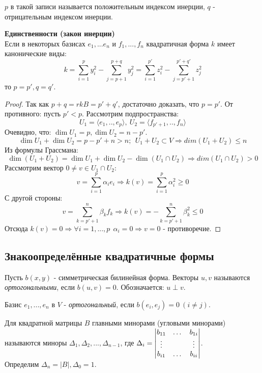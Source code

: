 \begin{definition}
    $p$ в такой записи называется положительным индексом инерции, $q$ - отрицательным индексом инерции.
\end{definition} 
\begin{theorem} \textbf{ Единственности (закон инерции)} \\
    Если в некоторых базисах $e_1,...e_n$ и $f_1,...,f_n$ квадратичная форма $k$ имеет канонические виды:
    $$k = \sum \limits_{i=1}^p y_i^2 - \sum \limits_{j=p+1}^{p+q} y_j^2 = \sum \limits_{i=1}^{p'} z_i^2 - \sum \limits_{j=p'+1}^{p'+q'} z_j^2$$
    то $p = p', q = q'$.
\end{theorem} 
\begin{proof}
    Так как $p + q = rk B = p' + q'$, достаточно доказать, что $p = p'$.
    От противного: пусть $p' < p$. Рассмотрим подпространства: 
    $$U_1 = \langle e_1,..,e_p \rangle, \ U_2 = \langle f_{p'+1},..,f_n \rangle$$ 
    Очевидно, что: $\dim U_1 = p, \dim U_2 = n- p'$.
    $$\dim U_1 + \dim U_2 = p - p' + n > n; \ \ U_1 + U_2 \subset V \Rightarrow dim(U_1 + U_2) \leq n$$
    Из формулы Грассмана:
    $$\dim (U_1 + U_2) = \dim U_1 + \dim U_2 - \dim (U_1 \cap U_2) \Rightarrow dim(U_1 \cap U_2) > 0$$
    Рассмотрим вектор $0 \neq v \in U_1 \cap U_2$:
    $$v = \sum \limits_{i=1}^{p} \alpha_i e_i \Rightarrow k(v) = \sum \limits_{i=1}^{p} \alpha_i^2 \geq 0$$
    С другой стороны:
    $$v = \sum \limits_{k=p'+1}^{n} \beta_k f_k \Rightarrow k(v) = -\sum \limits_{k=p'+1}^{n} \beta_k^2 \leq 0$$
    Отсюда $k(v) = 0 \Longrightarrow \forall i = 1,...,p \ \ \alpha_i = 0 \Longrightarrow v = 0$ - противоречие.
\end{proof}
\subsection{Знакоопределённые квадратичные формы}
\begin{definition}
    Пусть $b(x, y)$ - симметрическая билинейная форма. Векторы $u, v$ называются \textit{ортогональными}, если $b(u, v) = 0$. Обозначается: $u \perp v$.
\end{definition}
\begin{definition} 
    Базис $e_1,...,e_n$ в $V$ - \textit{ортогональный}, если $b(e_i, e_j) = 0 \ (i \neq j)$.
\end{definition}
\begin{definition}
    Для квадратной матрицы $B$ главными минорами (угловыми минорами) называются миноры $\Delta_1,\Delta_2,...,\Delta_{n-1}$, где $\Delta_i = \begin{vmatrix} b_{11}&\dots&b_{1i}\\\vdots&\null&\vdots\\b_{i1}&\dots&b_{ii}\end{vmatrix}$. \\
    Определим $\Delta_n = |B|, \Delta_0 = 1$.
\end{definition}

